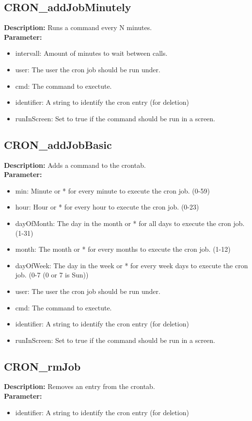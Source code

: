 \subsection{CRON\_addJobMinutely}
\textbf{Description:} Runs a command every N minutes.\\
\textbf{Parameter:}
\begin{itemize}
\item intervall: Amount of minutes to wait between calls.
\item user: The user the cron job should be run under.
\item cmd: The command to exectute.
\item identifier: A string to identify the cron entry (for deletion)
\item runInScreen: Set to true if the command should be run in a screen.
\end{itemize}

\subsection{CRON\_addJobBasic}
\textbf{Description:} Adds a command to the crontab.\\
\textbf{Parameter:}
\begin{itemize}
\item min: Minute or * for every minute to execute the cron job. (0-59)
\item hour: Hour or * for every hour to execute the cron job. (0-23)
\item dayOfMonth: The day in the month or * for all days to execute the cron job. (1-31)
\item month: The month or * for every months to execute the cron job. (1-12)
\item dayOfWeek: The day in the week or * for every week days to execute the cron job. (0-7 (0 or 7 is Sun))
\item user: The user the cron job should be run under.
\item cmd: The command to exectute.
\item identifier: A string to identify the cron entry (for deletion)
\item runInScreen: Set to true if the command should be run in a screen.
\end{itemize}

\subsection{CRON\_rmJob}
\textbf{Description:} Removes an entry from the crontab.\\
\textbf{Parameter:}
\begin{itemize}
\item identifier: A string to identify the cron entry (for deletion)
\end{itemize}

